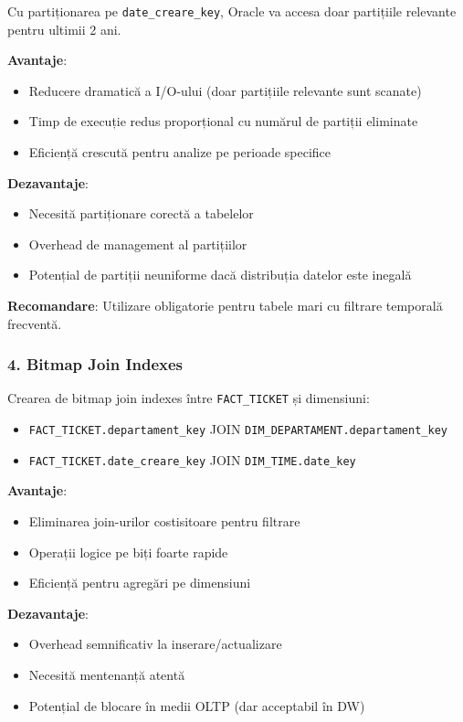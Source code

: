 Cu partiționarea pe \texttt{date\_creare\_key}, Oracle va accesa doar partițiile relevante pentru ultimii 2 ani.

\textbf{Avantaje}:
\begin{itemize}
    \item Reducere dramatică a I/O-ului (doar partițiile relevante sunt scanate)
    \item Timp de execuție redus proporțional cu numărul de partiții eliminate
    \item Eficiență crescută pentru analize pe perioade specifice
\end{itemize}

\textbf{Dezavantaje}:
\begin{itemize}
    \item Necesită partiționare corectă a tabelelor
    \item Overhead de management al partițiilor
    \item Potențial de partiții neuniforme dacă distribuția datelor este inegală
\end{itemize}

\textbf{Recomandare}: Utilizare obligatorie pentru tabele mari cu filtrare temporală frecventă.

\subsubsection{4. Bitmap Join Indexes}

Crearea de bitmap join indexes între \texttt{FACT\_TICKET} și dimensiuni:
\begin{itemize}
    \item \texttt{FACT\_TICKET.departament\_key} JOIN \texttt{DIM\_DEPARTAMENT.departament\_key}
    \item \texttt{FACT\_TICKET.date\_creare\_key} JOIN \texttt{DIM\_TIME.date\_key}
\end{itemize}

\textbf{Avantaje}:
\begin{itemize}
    \item Eliminarea join-urilor costisitoare pentru filtrare
    \item Operații logice pe biți foarte rapide
    \item Eficiență pentru agregări pe dimensiuni
\end{itemize}

\textbf{Dezavantaje}:
\begin{itemize}
    \item Overhead semnificativ la inserare/actualizare
    \item Necesită mentenanță atentă
    \item Potențial de blocare în medii OLTP (dar acceptabil în DW)
\end{itemize}

